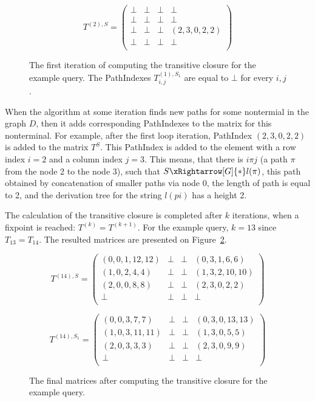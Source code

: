 \begin{figure}[h]
	\[
	T^{(2),S} = \begin{pmatrix}
	\bot & \bot       & \bot & \bot       \\
	\bot & \bot & \bot       & \bot \\
	\bot       & \bot & \bot & (2,3,0,2,2) \\
	\bot       & \bot & \bot & \bot \\
	\end{pmatrix}
	\]
	\caption{The first iteration of computing the transitive closure for the example query. The PathIndexes $T^{(1),S_1}_{i,j}$ are equal to $\bot$ for every $i,j$.}
	\label{ExampleQueryFirstIteration}
\end{figure}

When the algorithm at some iteration finds new paths for some nontermial in the graph $D$, then it adds corresponding PathIndexes to the matrix for this nonterminal. For example, after the first loop iteration, PathIndex $(2,3,0,2,2)$ is added to the matrix $T^{S}$. This PathIndex is added to the element with a row index $i = 2$ and a column index $j = 3$. This means, that there is $i\pi j$ (a path $\pi$ from the node 2 to the node 3), such that $S \xRightarrow[G]{*} l(\pi)$, this path obtained by concatenation of smaller paths via node 0, the length of path is equal to 2, and the derivation tree for the string $l(pi)$ has a height 2.

The calculation of the transitive closure is completed after $k$ iterations, when a fixpoint is reached: $T^{(k)} = T^{(k+1)}$. For the example query, $k = 13$ since $T_{13} = T_{14}$. The resulted matrices are presented on Figure~\ref{ExampleQueryFinalMatrices}.

\begin{figure}[h]
	\[
	T^{(14),S} = \begin{pmatrix}
	(0,0,1,12,12) & \bot       & \bot & (0,3,1,6,6)       \\
	(1,0,2,4,4) & \bot & \bot       & (1,3,2,10,10) \\
	(2,0,0,8,8)       & \bot & \bot & (2,3,0,2,2) \\
	\bot       & \bot & \bot & \bot \\
	\end{pmatrix}
	\]
	
	\[
	T^{(14),S_1} = \begin{pmatrix}
	(0,0,3,7,7)  & \bot       & \bot & (0,3,0,13,13)       \\
	(1,0,3,11,11) & \bot & \bot       & (1,3,0,5,5) \\
	(2,0,3,3,3)       & \bot & \bot & (2,3,0,9,9) \\
	\bot       & \bot & \bot & \bot \\
	\end{pmatrix}
	\]
	\caption{The final matrices after computing the transitive closure for the example query.}
	\label{ExampleQueryFinalMatrices}
\end{figure}

